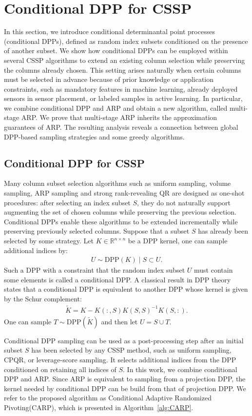 \documentclass[11pt]{article}
\newcommand{\be}{\begin{eqnarray}}
\newcommand{\ee}{\end{eqnarray}}
\newcommand{\Rnn}{\mathbb{R}^{n\times n}}
\newcommand{\<}{\langle}
\renewcommand{\>}{\rangle}
\begin{document}
\section{Conditional DPP for CSSP}
\label{sec:conditional_dpp}
In this section, we introduce conditional determinantal point processes (conditional DPPs), defined as random index subsets conditioned on the presence of another subset. We show how conditional DPPs can be employed within several CSSP algorithms to extend an existing column selection while preserving the columns already chosen. This setting arises naturally when certain columns must be selected in advance because of prior knowledge or application constraints, such as mandatory features in machine learning, already deployed sensors in sensor placement, or labeled samples in active learning. In particular, we combine conditional DPP and ARP and obtain a new algorithm, called multi-stage ARP. We prove that multi-stage ARP inherits the approximation guarantees of ARP. The resulting analysis reveals a connection between global DPP-based sampling strategies and some greedy algorithms.

\subsection{Conditional DPP for CSSP}
Many column subset selection algorithms such as uniform sampling, volume sampling, ARP sampling and strong rank-revealing QR are designed as one-shot procedures:
after selecting an index subset $S$, they do not naturally support augmenting the set of
chosen columns while preserving the previous selection. Conditional DPPs enable these algorithms to be extended incrementally while preserving previously selected columns. Suppose that a subset $S$ has already been selected by some strategy. Let $K\in \Rnn$ be a DPP kernel, one can sample additional indices by:
\be
U\sim \mathrm{DPP}(K)\mid S\subset U.
\ee
Such a DPP with a constraint that the random index subset $U$ must contain some elements is called a conditional DPP. A classical result in DPP theory \cite{kulesza2012dpp} states that a conditional DPP is equivalent to another DPP whose kernel is given by the Schur complement:
\be
\widetilde K = K - K(:,S)K(S,S)^{-1}K(S,:).
\ee
One can sample $T\sim \mathrm{DPP}(\widetilde K)$ and then let $U = S\cup T$.

Conditional DPP sampling can be used as a post-processing step after an initial subset $S$ has been selected by any CSSP method, such as uniform sampling, CPQR, or leverage-score sampling. It selects additional indices from the DPP conditioned on retaining all indices of $S$. In this work, we combine conditional DPP and ARP. Since ARP is equivalent to sampling from a projection DPP, the kernel needed by conditional DPP can be build from that of projection DPP. We refer to the proposed algorithm as Conditional Adaptive Randomized Pivoting(CARP), which is presented in Algorithm~\ref{alg:CARP}.
\end{document}
